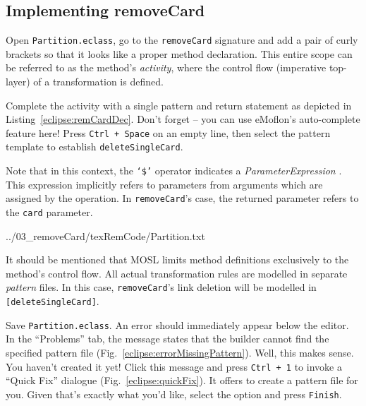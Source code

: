 \newpage
\hypertarget{remCard tex}{}
\subsection{Implementing removeCard}
\texHeader

\disclaimerForTextualSyntax

\begin{itemize}

\itemWithRightTriangle Open \texttt{Partition.eclass}, go to the
\texttt{removeCard} signature and add a pair of curly brackets so that it looks like a proper method declaration. This entire scope can be referred to as the method's \emph{activity}, where the control flow (imperative top-layer) of a
transformation is defined.

\itemWithRightTriangle Complete the activity with a single pattern and return statement as depicted in Listing~\ref{eclipse:remCardDec}. Don't forget -- you
can use eMoflon's auto-complete feature here! Press \texttt{Ctrl + Space} on an
empty line, then select the pattern template to establish \texttt{deleteSingleCard}.

\itemWithRightTriangle Note that in this context, the \texttt{`\$'} operator indicates a \emph{ParameterExpression}%
. This expression implicitly refers to parameters from arguments which are assigned by the operation. In \texttt{removeCard}'s case, the returned parameter refers to the \texttt{card} parameter.

\vspace{0.5cm}

 {../03_removeCard/texRemCode/Partition.txt} 

\itemWithRightTriangle It should be mentioned that MOSL limits method definitions exclusively to the method's control flow. All actual transformation
rules are modelled in separate \emph{pattern} files. In this case, \texttt{removeCard}'s link deletion will be modelled in \texttt{[deleteSingleCard]}.

\vspace{0.5cm}

\itemWithRightTriangle Save \texttt{Partition.eclass}. An error should immediately appear below the editor. In the ``Problems'' tab, the message
states that the builder cannot find the specified pattern file (Fig.~\ref{eclipse:errorMissingPattern}). Well, this makes sense. You haven't created it yet! Click this message and press \texttt{Ctrl +
1} to invoke a ``Quick Fix'' dialogue (Fig.~\ref{eclipse:quickFix}). It offers to create a pattern file for you. Given that's exactly what you'd like, select the
option and press \texttt{Finish}.


\end{itemize}
